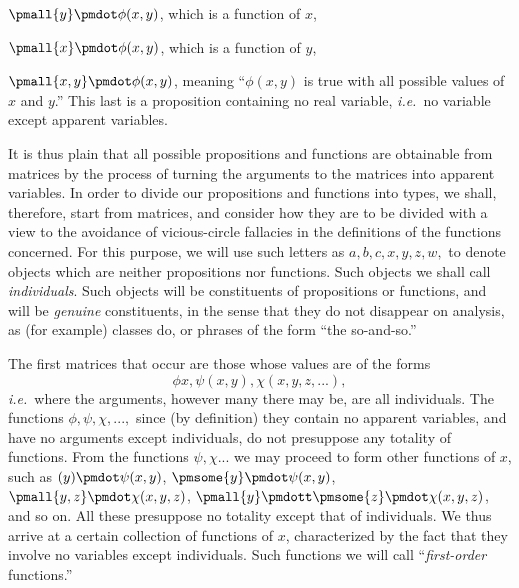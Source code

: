 \documentclass[letterpaper,12pt,openany,leqno]{book}
\newcommand{\pagefirst}[1]{\marginnote[\boxed{\text{#1}}]{\boxed{\text{#1}}}}
\begin{document}
\indent $\pmall{y} \pmdot \phi(x,y)$, which is a function of $x$,

\indent $\pmall{x}\pmdot \phi(x,y)$, which is a function of $y$,

$\pmall{x, y}\pmdot \phi(x, y)$, meaning ``$\phi(x, y)$ is true with all possible values of $x$ and $y$.'' This last is a proposition containing no real variable, \textit{i.e.}\ no variable except apparent variables.

It is thus plain that all possible propositions and functions are obtainable from matrices by the process of turning the arguments to the matrices into apparent variables. In order to divide our propositions and functions into types, we shall, therefore, start from matrices, and consider how they are to be divided with a view to the avoidance of vicious-circle fallacies in the definitions of the functions concerned. For this purpose, we will use such letters as $a, b, c, x, y, z, w,$ to denote objects which are neither propositions nor functions. Such objects we shall call \textit{individuals}. Such objects will be \pagefirst{54} constituents of propositions or functions, and will be \textit{genuine} constituents, in the sense that they do not disappear on analysis, as (for example) classes do, or phrases of the form ``the so-and-so.''

The first matrices that occur are those whose values are of the forms
\[
	\phi x, \psi(x,y), \chi(x, y, z,...),
\]
\textit{i.e.}\ where the arguments, however many there may be, are all individuals. The functions $\phi, \psi, \chi, ...,$ since (by definition) they contain no apparent variables, and have no arguments except individuals, do not presuppose any totality of functions. From the functions $\psi, \chi ...$ we may proceed to form other functions of $x$, such as $(y) \pmdot \psi(x, y)$, $\pmsome{y} \pmdot \psi(x, y)$, $\pmall{y, z}\pmdot \chi(x, y, z)$, $\pmall{y}\pmdott \pmsome{z}\pmdot \chi(x, y, z)$, and so on. All these presuppose no totality except that of individuals. We thus arrive at a certain collection of functions of $x$, characterized by the fact that they involve no variables except individuals. Such functions we will call ``\textit{first-order} functions.''
\end{document}
